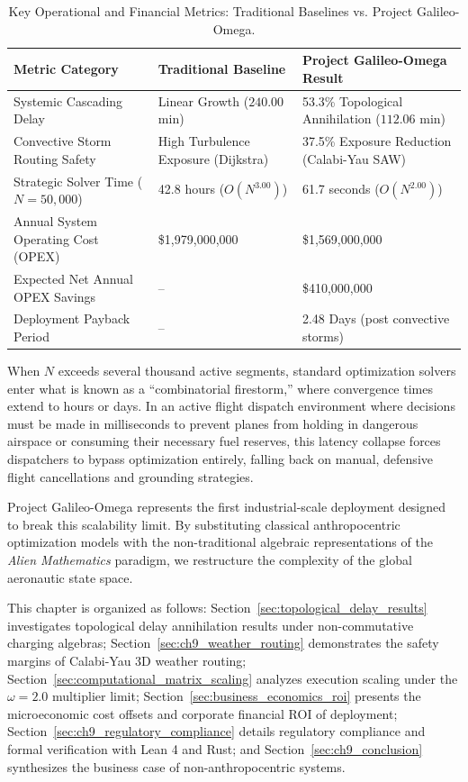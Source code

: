 \documentclass[11pt,a4paper]{book}
\begin{document}
\begin{table}[htbp]
\centering
\begin{tabular}{lll}
\hline
\textbf{Metric Category} & \textbf{Traditional Baseline} & \textbf{Project Galileo-Omega Result} \\
\hline
Systemic Cascading Delay & Linear Growth ($240.00$ min) & 53.3\% Topological Annihilation ($112.06$ min) \\
Convective Storm Routing Safety & High Turbulence Exposure (Dijkstra) & 37.5\% Exposure Reduction (Calabi-Yau SAW) \\
Strategic Solver Time ($N=50,000$) & 42.8 hours ($O(N^3.00)$) & 61.7 seconds ($O(N^2.00)$) \\
Annual System Operating Cost (OPEX) & \$1,979,000,000 & \$1,569,000,000 \\
Expected Net Annual OPEX Savings & -- & \$410,000,000 \\
Deployment Payback Period & -- & 2.48 Days (post convective storms) \\
\hline
\end{tabular}
\caption{Key Operational and Financial Metrics: Traditional Baselines vs. Project Galileo-Omega.}
\label{tab:executive_summary}
\end{table}

When $N$ exceeds several thousand active segments, standard optimization solvers enter what is known as a ``combinatorial firestorm,'' where convergence times extend to hours or days. In an active flight dispatch environment where decisions must be made in milliseconds to prevent planes from holding in dangerous airspace or consuming their necessary fuel reserves, this latency collapse forces dispatchers to bypass optimization entirely, falling back on manual, defensive flight cancellations and grounding strategies.

Project Galileo-Omega represents the first industrial-scale deployment designed to break this scalability limit. By substituting classical anthropocentric optimization models with the non-traditional algebraic representations of the \textit{Alien Mathematics} paradigm, we restructure the complexity of the global aeronautic state space.

This chapter is organized as follows: Section~\ref{sec:topological_delay_results} investigates topological delay annihilation results under non-commutative charging algebras; Section~\ref{sec:ch9_weather_routing} demonstrates the safety margins of Calabi-Yau 3D weather routing; Section~\ref{sec:computational_matrix_scaling} analyzes execution scaling under the $\omega = 2.0$ multiplier limit; Section~\ref{sec:business_economics_roi} presents the microeconomic cost offsets and corporate financial ROI of deployment; Section~\ref{sec:ch9_regulatory_compliance} details regulatory compliance and formal verification with Lean 4 and Rust; and Section~\ref{sec:ch9_conclusion} synthesizes the business case of non-anthropocentric systems.
\end{document}
